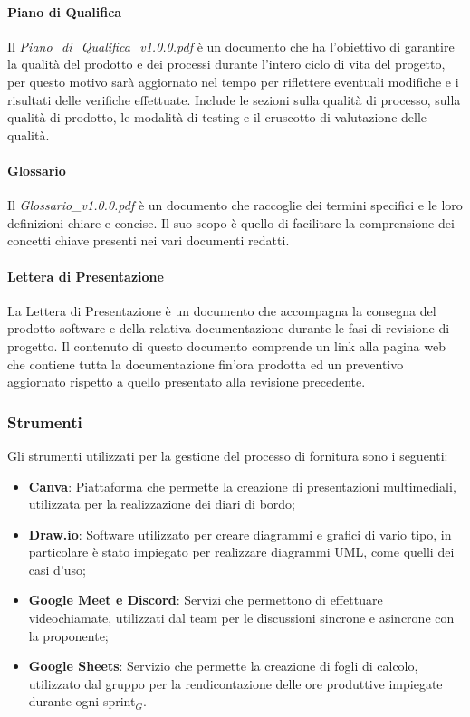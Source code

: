 \documentclass[10pt]{article}
\begin{document}
\begin{justify}
        \paragraph{Piano di Qualifica}
        Il \textit{Piano\_di\_Qualifica\_v1.0.0.pdf} è un documento che ha l'obiettivo di garantire la qualità del prodotto e dei processi durante l'intero ciclo di vita del progetto, per questo motivo sarà aggiornato nel tempo per riflettere eventuali modifiche e i risultati delle verifiche effettuate. Include le sezioni sulla qualità di processo, sulla qualità di prodotto, le modalità di testing e il cruscotto di valutazione delle qualità.\\

        \paragraph{Glossario}
        Il \textit{Glossario\_v1.0.0.pdf} è un documento che raccoglie dei termini specifici e le loro definizioni chiare e concise. Il suo scopo è quello di facilitare la comprensione dei concetti chiave presenti nei vari documenti redatti.\\

        \paragraph{Lettera di Presentazione}
        La Lettera di Presentazione è un documento che accompagna la consegna del prodotto software e della relativa documentazione durante le fasi di revisione di progetto. Il contenuto di questo documento comprende un link alla pagina web che contiene tutta la documentazione fin'ora prodotta ed un preventivo aggiornato rispetto a quello presentato alla revisione precedente.\\

    \subsubsection{Strumenti}
    Gli strumenti utilizzati per la gestione del processo di fornitura sono i seguenti:
    \begin{itemize}
        \item \textbf{Canva}: Piattaforma che permette la creazione di presentazioni multimediali, utilizzata per la realizzazione dei diari di bordo;
        \item \textbf{Draw.io}: Software utilizzato per creare diagrammi e grafici di vario tipo, in particolare è stato impiegato per realizzare diagrammi UML, come quelli dei casi d'uso;
        \item \textbf{Google Meet e Discord}: Servizi che permettono di effettuare videochiamate, utilizzati dal team per le discussioni sincrone e asincrone con la proponente;
        \item \textbf{Google Sheets}: Servizio che permette la creazione di fogli di calcolo, utilizzato dal gruppo per la rendicontazione delle ore produttive impiegate durante ogni sprint$_G$.
    \end{itemize}


\end{justify}
\end{document}
